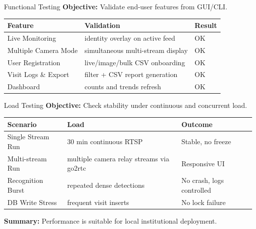 \documentclass[10pt]{beamer}
\begin{document}
\begin{frame}{Functional Testing}
\textbf{Objective:} Validate end-user features from GUI/CLI.

\vspace{0.2cm}
\footnotesize
\begin{center}
\begin{tabular}{|p{3.6cm}|p{3.9cm}|p{1.6cm}|}
\hline
\textbf{Feature} & \textbf{Validation} & \textbf{Result} \\ \hline
Live Monitoring & identity overlay on active feed & OK \\ \hline
Multiple Camera Mode & simultaneous multi-stream display & OK \\ \hline
User Registration & live/image/bulk CSV onboarding & OK \\ \hline
Visit Logs \& Export & filter + CSV report generation & OK \\ \hline
Dashboard & counts and trends refresh & OK \\ \hline
\end{tabular}
\end{center}
\normalsize
\end{frame}

\begin{frame}{Load Testing}
\textbf{Objective:} Check stability under continuous and concurrent load.

\vspace{0.2cm}
\footnotesize
\begin{center}
\begin{tabular}{|p{3.1cm}|p{3.0cm}|p{2.9cm}|}
\hline
\textbf{Scenario} & \textbf{Load} & \textbf{Outcome} \\ \hline
Single Stream Run & 30 min continuous RTSP & Stable, no freeze \\ \hline
Multi-stream Run & multiple camera relay streams via go2rtc & Responsive UI \\ \hline
Recognition Burst & repeated dense detections & No crash, logs controlled \\ \hline
DB Write Stress & frequent visit inserts & No lock failure \\ \hline
\end{tabular}
\end{center}
\normalsize

\textbf{Summary:} Performance is suitable for local institutional deployment.
\end{frame}
\end{document}
